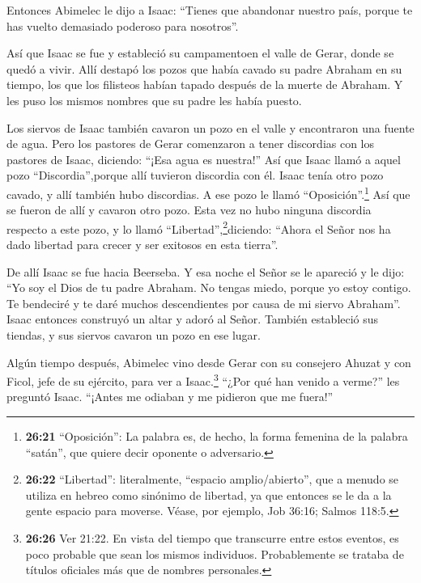  Entonces Abimelec le dijo a Isaac: ``Tienes que abandonar
nuestro país, porque te has vuelto demasiado poderoso para nosotros''.

 Así que Isaac se fue y estableció su campamentoen el valle
de Gerar, donde se quedó a vivir.  Allí destapó los pozos
que había cavado su padre Abraham en su tiempo, los que los filisteos
habían tapado después de la muerte de Abraham. Y les puso los mismos
nombres que su padre les había puesto.

 Los siervos de Isaac también cavaron un pozo en el valle y
encontraron una fuente de agua.  Pero los pastores de Gerar
comenzaron a tener discordias con los pastores de Isaac, diciendo:
``¡Esa agua es nuestra!'' Así que Isaac llamó a aquel pozo
``Discordia'',porque allí tuvieron discordia con él.  Isaac
tenía otro pozo cavado, y allí también hubo discordias. A ese pozo le
llamó ``Oposición''.\footnote{\textbf{26:21} ``Oposición'': La palabra
  es, de hecho, la forma femenina de la palabra ``satán'', que quiere
  decir oponente o adversario.}  Así que se fueron de allí
y cavaron otro pozo. Esta vez no hubo ninguna discordia respecto a este
pozo, y lo llamó ``Libertad'',\footnote{\textbf{26:22} ``Libertad'':
  literalmente, ``espacio amplio/abierto'', que a menudo se utiliza en
  hebreo como sinónimo de libertad, ya que entonces se le da a la gente
  espacio para moverse. Véase, por ejemplo, Job 36:16; Salmos 118:5.}diciendo:
``Ahora el Señor nos ha dado libertad para crecer y ser exitosos en esta
tierra''.

 De allí Isaac se fue hacia Beerseba.  Y esa
noche el Señor se le apareció y le dijo: ``Yo soy el Dios de tu padre
Abraham. No tengas miedo, porque yo estoy contigo. Te bendeciré y te
daré muchos descendientes por causa de mi siervo Abraham''.
 Isaac entonces construyó un altar y adoró al Señor.
También estableció sus tiendas, y sus siervos cavaron un pozo en ese
lugar.

 Algún tiempo después, Abimelec vino desde Gerar con su
consejero Ahuzat y con Ficol, jefe de su ejército, para ver a
Isaac.\footnote{\textbf{26:26} Ver 21:22. En vista del tiempo que
  transcurre entre estos eventos, es poco probable que sean los mismos
  individuos. Probablemente se trataba de títulos oficiales más que de
  nombres personales.}  ``¿Por qué han venido a verme?''
les preguntó Isaac. ``¡Antes me odiaban y me pidieron que me fuera!''

